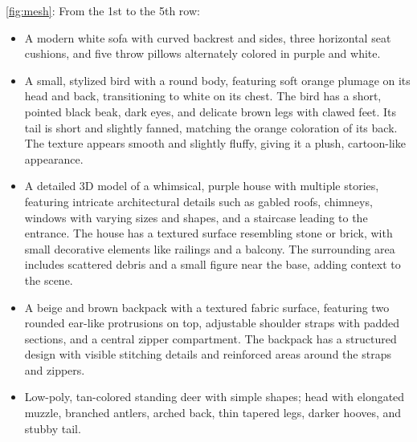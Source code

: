 \noindent\cref{fig:mesh}: From the 1st to the 5th row:
\begin{itemize}
\item A modern white sofa with curved backrest and sides, three horizontal seat cushions, and five throw pillows alternately colored in purple and white.
\item A small, stylized bird with a round body, featuring soft orange plumage on its head and back, transitioning to white on its chest. The bird has a short, pointed black beak, dark eyes, and delicate brown legs with clawed feet. Its tail is short and slightly fanned, matching the orange coloration of its back. The texture appears smooth and slightly fluffy, giving it a plush, cartoon-like appearance.
\item A detailed 3D model of a whimsical, purple house with multiple stories, featuring intricate architectural details such as gabled roofs, chimneys, windows with varying sizes and shapes, and a staircase leading to the entrance. The house has a textured surface resembling stone or brick, with small decorative elements like railings and a balcony. The surrounding area includes scattered debris and a small figure near the base, adding context to the scene.
\item A beige and brown backpack with a textured fabric surface, featuring two rounded ear-like protrusions on top, adjustable shoulder straps with padded sections, and a central zipper compartment. The backpack has a structured design with visible stitching details and reinforced areas around the straps and zippers.
\item Low-poly, tan-colored standing deer with simple shapes; head with elongated muzzle, branched antlers, arched back, thin tapered legs, darker hooves, and stubby tail.
\end{itemize}

